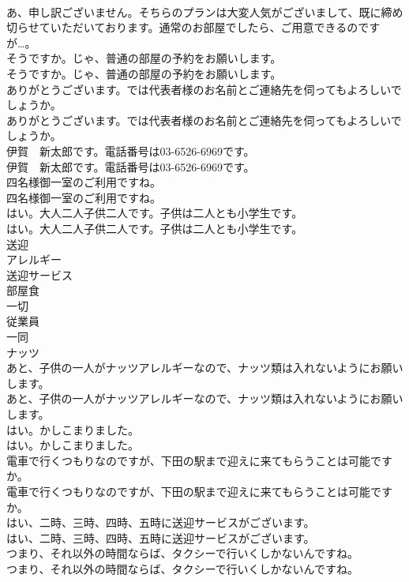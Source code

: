 \documentclass[8pt]{extreport}
\begin{document}
\begin{CJK}{UTF8}{min}
\\	あ、申し訳ございません。そちらのプランは大変人気がございまして、既に締め切らせていただいております。通常のお部屋でしたら、ご用意できるのですが…。 
\\	そうですか。じゃ、普通の部屋の予約をお願いします。	
\\	そうですか。じゃ、普通の部屋の予約をお願いします。 
\\	ありがとうございます。では代表者様のお名前とご連絡先を伺ってもよろしいでしょうか。	
\\	ありがとうございます。では代表者様のお名前とご連絡先を伺ってもよろしいでしょうか。 
\\	伊賀　新太郎です。電話番号は03-6526-6969です。	
\\	伊賀　新太郎です。電話番号は03-6526-6969です。 
\\	四名様御一室のご利用ですね。	
\\	四名様御一室のご利用ですね。 
\\	はい。大人二人子供二人です。子供は二人とも小学生です。	
\\	はい。大人二人子供二人です。子供は二人とも小学生です。 
\\	送迎
\\	アレルギー
\\	送迎サービス
\\	部屋食
\\	一切
\\	従業員
\\	一同
\\	ナッツ
\\	あと、子供の一人がナッツアレルギーなので、ナッツ類は入れないようにお願いします。	
\\	あと、子供の一人がナッツアレルギーなので、ナッツ類は入れないようにお願いします。 
\\	はい。かしこまりました。	
\\	はい。かしこまりました。 
\\	電車で行くつもりなのですが、下田の駅まで迎えに来てもらうことは可能ですか。	
\\	電車で行くつもりなのですが、下田の駅まで迎えに来てもらうことは可能ですか。 
\\	はい、二時、三時、四時、五時に送迎サービスがございます。	
\\	はい、二時、三時、四時、五時に送迎サービスがございます。 
\\	つまり、それ以外の時間ならば、タクシーで行いくしかないんですね。	
\\	つまり、それ以外の時間ならば、タクシーで行いくしかないんですね。 

\end{CJK}
\end{document}
